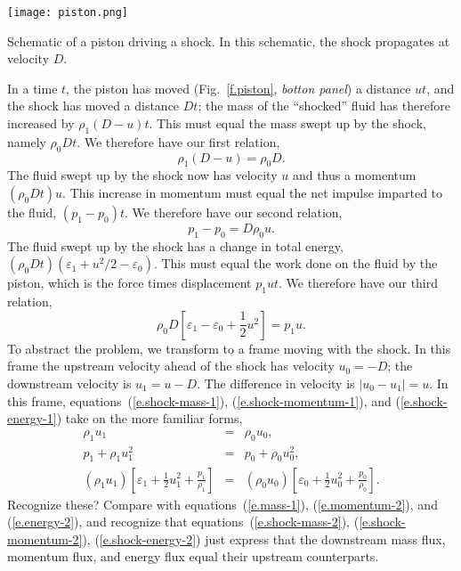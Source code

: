 \begin{marginfigure}
\texttt{[image: piston.png]}
\caption{Schematic of a piston driving a shock.  In this schematic, the shock propagates at velocity $D$.}
\label{f.piston}
\end{marginfigure}

In a time $t$, the piston has moved (Fig.~\ref{f.piston}, \emph{botton panel}) a distance $ut$, and the shock has moved a distance $Dt$; the mass of the ``shocked'' fluid has therefore increased by $\rho_{1}(D-u)t$.  This must equal the mass swept up by the shock, namely $\rho_{0}Dt$.  We therefore have our first relation,
\begin{equation}\label{e.shock-mass-1}
\rho_{1}(D-u) = \rho_{0}D.
\end{equation}
The fluid swept up by the shock now has velocity $u$ and thus a momentum $(\rho_{0}Dt)u$. This increase in momentum must equal the net impulse imparted to the fluid, $(p_{1}-p_{0})t$.  We therefore have our second relation,
\begin{equation}\label{e.shock-momentum-1}
p_{1} - p_{0} = D\rho_{0}u.
\end{equation}
The fluid swept up by the shock has a change in total energy, $(\rho_{0}D t)(\varepsilon_{1} + u^{2}/2 -\varepsilon_{0})$. This must equal the work done on the fluid by the piston, which is the force times displacement $p_{1}ut$.  We therefore have our third relation,
\begin{equation}\label{e.shock-energy-1}
\rho_{0}D\left[\varepsilon_{1}-\varepsilon_{0} + \frac{1}{2}u^{2}\right] = p_{1}u.
\end{equation}
To abstract the problem, we transform to a frame moving with the shock.  In this frame the upstream velocity ahead of the shock has velocity $u_{0} = -D$; the downstream velocity is $u_{1} = u-D$.  The difference in velocity is $|u_{0} - u_{1}| = u$.
In this frame, equations~(\ref{e.shock-mass-1}), (\ref{e.shock-momentum-1}), and (\ref{e.shock-energy-1}) take on the more familiar forms,
\begin{eqnarray}
\rho_{1}u_{1} &=& \rho_{0}u_{0},\label{e.shock-mass-2}\\
p_{1} + \rho_{1}u_{1}^{2} &=& p_{0} + \rho_{0}u_{0}^{2},\label{e.shock-momentum-2}\\
(\rho_{1}u_{1})\left[\varepsilon_{1} + \frac{1}{2}u_{1}^{2} + \frac{p_{1}}{\rho_{1}}\right] &=& 
	(\rho_{0}u_{0})\left[\varepsilon_{0} + \frac{1}{2}u_{0}^{2} + \frac{p_{0}}{\rho_{0}}\right]. 
			\label{e.shock-energy-2}
\end{eqnarray}
Recognize these?  Compare with equations~(\ref{e.mass-1}), (\ref{e.momentum-2}), and (\ref{e.energy-2}), and recognize that equations~(\ref{e.shock-mass-2}), (\ref{e.shock-momentum-2}), (\ref{e.shock-energy-2}) just express that the downstream mass flux, momentum flux, and energy flux equal their upstream counterparts.

